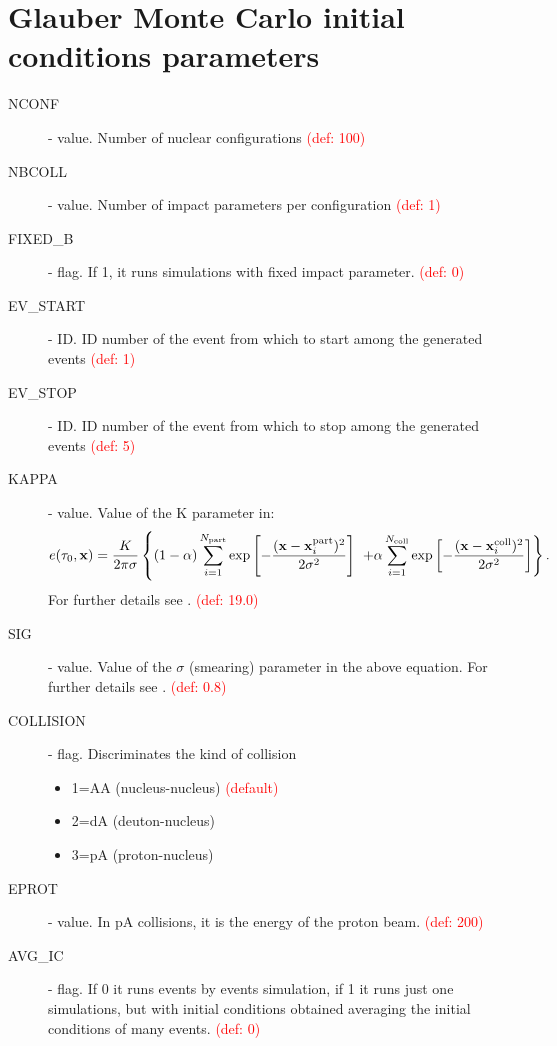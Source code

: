 \section{Glauber Monte Carlo initial conditions parameters}
\begin{description}
 \item[NCONF] \integer - value. Number of nuclear configurations \textcolor{red}{(def: 100)}
 \item[NBCOLL] \integer - value. Number of impact parameters per configuration \textcolor{red}{(def: 1)}
 \item[FIXED\_B] \integer - flag. If 1, it runs simulations with fixed impact parameter. \textcolor{red}{(def: 0)}
 \item[EV\_START] \integer - ID. ID number of the event from which to start among the generated events \textcolor{red}{(def: 1)}
\item[EV\_STOP] \integer - ID. ID number of the event from which to stop among the generated events \textcolor{red}{(def: 5)}
\item[KAPPA] \real - value. Value of the K parameter in:
\begin{equation}
 e(\tau_0,\mathbf{x})=\frac{K}{2\pi\sigma}\left\{(1-\alpha)\sum_{i=1}^{N_{\mathrm{part}}} 
  \exp\left[-\frac{(\mathbf{x}-\mathbf{x}_i^{\mathrm{part}})^2}{2\sigma^2} \right] \right.\\ 
\left.+\alpha\sum_{i=1}^{N_{\rm coll}}\exp\left[-
  \frac{(\mathbf{x}-\mathbf{x}_i^{\rm coll})^2}{2\sigma^2}\right]\right\}. \nonumber
\end{equation}
For further details see \cite{DelZanna:2013eua,Holopainen:2010gz}. \textcolor{red}{(def: 19.0)}
\item[SIG] \real - value. Value of the $\sigma$ (smearing) parameter in the above equation. For further details see \cite{DelZanna:2013eua,Holopainen:2010gz}. \textcolor{red}{(def: 0.8)}
\item[COLLISION] \integer - flag. Discriminates the kind of collision
\begin{itemize}
 \item 1=AA (nucleus-nucleus) \textcolor{red}{(default)}
 \item 2=dA (deuton-nucleus)
 \item 3=pA (proton-nucleus)
\end{itemize}
\item[EPROT] \real - value. In pA collisions, it is the energy of the proton beam. \textcolor{red}{(def: 200)} 
\item[AVG\_IC] \integer - flag. If 0 it runs events by events simulation, if 1 it runs just one simulations, but with initial conditions obtained averaging the initial conditions of many events. \textcolor{red}{(def: 0)}

\end{description}
